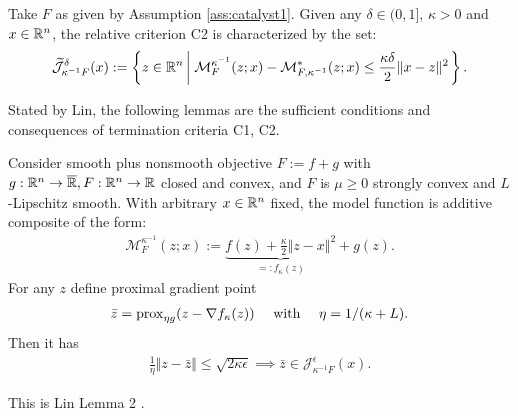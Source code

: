 \documentclass[12pt]{article}
\begin{document}
        \begin{definition}\label{def:catalyst-termination-c2}
            Take $F$ as given by Assumption \ref{ass:catalyst1}. 
            Given any $\delta \in (0, 1]$, $\kappa > 0$ and $x \in \mathbb R^n$, the relative criterion C2 is characterized by the set: 
            \begin{align*}
                \widetilde{\mathcal J}_{\kappa^{-1}F}^\delta (x)
                := 
                \left\lbrace
                    z \in \mathbb R^n \left| \;
                        \mathcal M_F^{\kappa^{-1}}(z; x) - 
                        \mathcal M^*_{F, \kappa^{-1}}(z; x) 
                        \le \frac{\kappa\delta}{2}\Vert x - z\Vert^2
                    \right.
                \right\rbrace. 
            \end{align*}
        \end{definition}
        Stated by Lin, the following lemmas are the sufficient conditions and consequences of termination criteria C1, C2. 

        \begin{lemma}\label{lemma:sufficient-c1}
            Consider smooth plus nonsmooth objective $F := f + g$ with $g:\mathbb R^n \rightarrow \overline {\mathbb R}, F:\mathbb R^n \rightarrow \mathbb R$ closed and convex, and $F$ is $\mu\ge 0$ strongly convex and $L$-Lipschitz smooth. 
            With arbitrary $x \in \mathbb R^n$ fixed, the model function is additive composite of the form: 
            \begin{align*}
                \mathcal M_F^{\kappa^{-1}}(z; x) := 
                \underbrace{f(z) + \frac{\kappa}{2}\Vert z - x\Vert^2}_{=: f_\kappa (z)}
                 + g(z). 
            \end{align*}
            For any $z$ define proximal gradient point 
            \begin{align*}
                \bar z = \operatorname{prox}_{\eta g}(z - \nabla f_\kappa(z)) 
                \quad 
                \text{ with } \quad  \eta = 1/(\kappa + L). 
            \end{align*}
            Then it has 
            \begin{align*}
                \frac{1}{\eta}\Vert z - \bar z\Vert
                \le \sqrt{2\kappa \epsilon} \implies 
                \bar z \in \mathcal 
                J_{\kappa^{-1}F}^\epsilon (x). 
            \end{align*}
        \end{lemma}
        \begin{remark}
            This is Lin Lemma 2 \cite{lin_catalyst_2018}. 
        \end{remark}
\end{document}
